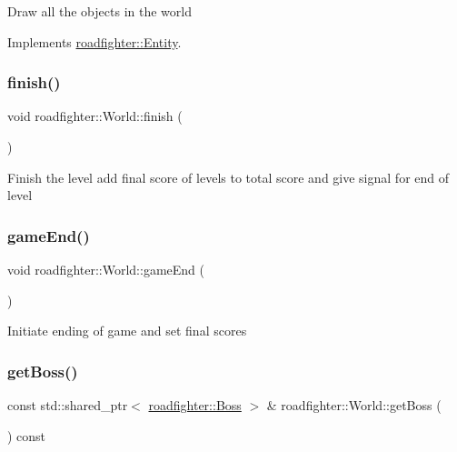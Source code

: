 Draw all the objects in the world 

Implements \hyperlink{classroadfighter_1_1Entity_ac516f8005f969ad5a86c252e5a3640ee}{roadfighter\+::\+Entity}.

\mbox{\label{classroadfighter_1_1World_af98f2facb11b701737df27b70b4b242a}} 
\subsubsection{\texorpdfstring{finish()}{finish()}}
{\footnotesize\ttfamily void roadfighter\+::\+World\+::finish (\begin{DoxyParamCaption}{ }\end{DoxyParamCaption})}

Finish the level add final score of levels to total score and give signal for end of level \mbox{\label{classroadfighter_1_1World_a543b7c682003fb1cee2f51f093bf75ea}} 
\subsubsection{\texorpdfstring{game\+End()}{gameEnd()}}
{\footnotesize\ttfamily void roadfighter\+::\+World\+::game\+End (\begin{DoxyParamCaption}{ }\end{DoxyParamCaption})}

Initiate ending of game and set final scores \mbox{\label{classroadfighter_1_1World_ac90d75fc462dcc7b966d7d13fd18b9cf}} 
\subsubsection{\texorpdfstring{get\+Boss()}{getBoss()}}
{\footnotesize\ttfamily const std\+::shared\+\_\+ptr$<$ \hyperlink{classroadfighter_1_1Boss}{roadfighter\+::\+Boss} $>$ \& roadfighter\+::\+World\+::get\+Boss (\begin{DoxyParamCaption}{ }\end{DoxyParamCaption}) const}

